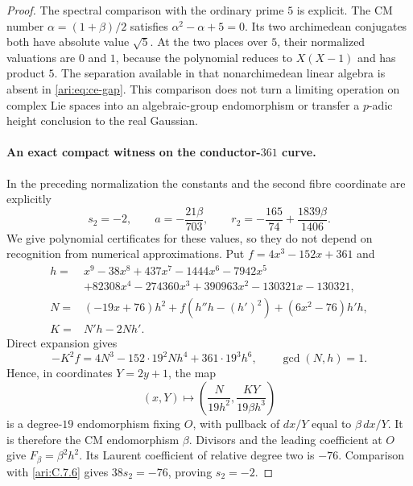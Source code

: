 \begin{proof}
The spectral comparison with the ordinary prime $5$ is
explicit. The CM number $\alpha=(1+\beta)/2$ satisfies
$\alpha^2-\alpha+5=0$. Its two archimedean conjugates
both have absolute value $\sqrt5$. At the two places over
$5$, their normalized valuations are $0$ and $1$, because
the polynomial reduces to $X(X-1)$ and has product $5$.
The separation available in that nonarchimedean linear
algebra is absent in \eqref{ari:eq:ce-gap}. This comparison
does not turn a limiting operation on complex Lie spaces
into an algebraic-group endomorphism or transfer a
$p$-adic height conclusion to the real Gaussian.

\paragraph{An exact compact witness on the conductor-$361$ curve.}
In the preceding normalization the constants and the second
fibre coordinate are explicitly
\begin{equation}\label{ari:eq:ce-explicit-witness}
 s_2=-2,\qquad a=-\frac{21\beta}{703},\qquad
 r_2=-\frac{165}{74}+\frac{1839\beta}{1406}.
\end{equation}
We give polynomial certificates for these values, so they
do not depend on recognition from numerical approximations.
Put $f=4x^3-152x+361$ and
\[
 \begin{aligned}
 h={}&x^9-38x^8+437x^7-1444x^6-7942x^5\\
     &+82308x^4-274360x^3+390963x^2-130321x-130321,\\
 N={}&(-19x+76)h^2+f(h''h-(h')^2)+(6x^2-76)h'h,\\
 K={}&N'h-2Nh'.
 \end{aligned}
\]
Direct expansion gives
\[
 -K^2f=4N^3-152\cdot19^2Nh^4+361\cdot19^3h^6,
 \qquad \gcd(N,h)=1.
\]
Hence, in coordinates $Y=2y+1$, the map
\[
 (x,Y)\longmapsto
 \left(\frac{N}{19h^2},\frac{KY}{19\beta h^3}\right)
\]
is a degree-$19$ endomorphism fixing $O$, with pullback of
$dx/Y$ equal to $\beta\,dx/Y$. It is therefore the CM
endomorphism $\beta$. Divisors and the leading coefficient
at $O$ give $F_\beta=\beta^2h^2$. Its Laurent coefficient
of relative degree two is $-76$. Comparison with \ref{ari:C.7.6}
gives $38s_2=-76$, proving $s_2=-2$.


\end{proof}
